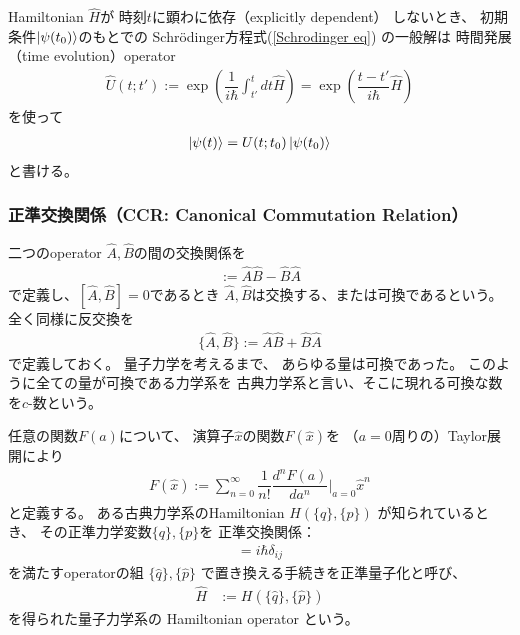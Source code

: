 Hamiltonian $\hat{H}$が
時刻$t$に顕わに依存（explicitly dependent）
しないとき、
初期条件$\ket{ \psi(t_0) }$のもとでの
Schr\"odinger方程式(\ref{Schrodinger eq})
の一般解は
時間発展（time evolution）operator
\begin{align}
    \hat{U}(t;t')
    :=
    \exp\left(
        \dfrac{1}{i \hbar}
        \int_{t'}^{t}dt
        \hat{H}
    \right)
    =
    \exp\left(
        \dfrac{t - t'}{i \hbar}
        \hat{H}
    \right)
\label{time evolution operator}
\end{align}
を使って
\begin{align}
    \ket{ \psi(t) }
    =
    U (t;t_0)
    \ket{ \psi(t_0) }
\end{align}
と書ける。

\subsubsection{正準交換関係（CCR: Canonical Commutation Relation）}
\label{subsubsec: CCR}

二つのoperator $\hat{A}, \hat{B}$の間の交換関係を
\begin{align}
    [\hat{A}, \hat{B}] := \hat{A} \hat{B} - \hat{B} \hat{A}
\end{align}
で定義し、$[\hat{A}, \hat{B}] = 0$であるとき
$\hat{A}, \hat{B}$は交換する、または可換であるという。
全く同様に反交換を
\begin{align}
    \{\hat{A}, \hat{B}\} := \hat{A} \hat{B} + \hat{B} \hat{A}
\end{align}
で定義しておく。
量子力学を考えるまで、
あらゆる量は可換であった。
このように全ての量が可換である力学系を
古典力学系と言い、そこに現れる可換な数を$c$-数という。

任意の関数$F(a)$について、
演算子$\hat{x}$の関数$F(\hat{x})$を
（$a=0$周りの）Taylor展開により
\begin{align}
    F(\hat{x}) := \sum_{n=0}^\infty
        \dfrac{1}{n!}
        \dfrac{d^nF(a)}{da^n}\bigg|_{a=0}
        \hat{x}^n
\label{function of operator}
\end{align}
と定義する。
ある古典力学系のHamiltonian $H(\{q\},\{p\})$
が知られているとき、
その正準力学変数$\{q\},\{p\}$を
正準交換関係：
\begin{align}
    [ \hat{q}_i , \hat{p}_j ] = i\hbar \delta_{ij}
\end{align}
を満たすoperatorの組
$ \{\hat{q}\} , \{\hat{p}\} $
で置き換える手続きを正準量子化と呼び、
\begin{align}
    \hat{H}
    &:=
    H(\{\hat{q}\} , \{\hat{p}\})
\end{align}
を得られた量子力学系の
Hamiltonian operator
という。


